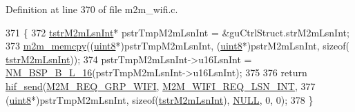 Definition at line 370 of file m2m\+\_\+wifi.\+c.


\begin{DoxyCode}
371 \{
372     \hyperlink{structtstrM2mLsnInt}{tstrM2mLsnInt}* pstrTmpM2mLsnInt = &guCtrlStruct.strM2mLsnInt;
373     \hyperlink{nm__common_8h_a62b30b611dfcc58e190254d1f663470a}{m2m\_memcpy}((\hyperlink{group__DataT_ga4df709a77647e870bbf1d955b8edc9a6}{uint8}*)pstrTmpM2mLsnInt, (\hyperlink{group__DataT_ga4df709a77647e870bbf1d955b8edc9a6}{uint8}*)pstrM2mLsnInt, \textcolor{keyword}{sizeof}(
      \hyperlink{structtstrM2mLsnInt}{tstrM2mLsnInt}));
374     pstrTmpM2mLsnInt->u16LsnInt = \hyperlink{nm__bsp_8h_a22348273616354c0ac8a3de5ce4fb963}{NM\_BSP\_B\_L\_16}(pstrTmpM2mLsnInt->u16LsnInt);
375     
376     \textcolor{keywordflow}{return} \hyperlink{m2m__hif_8c_a13ba8ad11b2ac39516ca787386d16ce0}{hif\_send}(\hyperlink{nm__common_8h_a9ab02eb1aea02a75c3f5aade4eef1276aeb9a7d57324ba4b8a6c2a5f46dd499c2}{M2M\_REQ\_GRP\_WIFI}, 
      \hyperlink{group__WlanEnums_gga064de09dec1d5e88ed8d075fa40f57deab1bc6e3955fd668d745a67d7b3ba9c36}{M2M\_WIFI\_REQ\_LSN\_INT}, 
377         (\hyperlink{group__DataT_ga4df709a77647e870bbf1d955b8edc9a6}{uint8}*)pstrTmpM2mLsnInt, \textcolor{keyword}{sizeof}(\hyperlink{structtstrM2mLsnInt}{tstrM2mLsnInt}), \hyperlink{group__BSPDefine_ga070d2ce7b6bb7e5c05602aa8c308d0c4}{NULL}, 0, 0);
378 \}
\end{DoxyCode}
